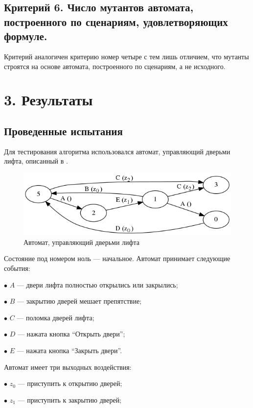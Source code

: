 \documentclass[12pt,fleqn]{article}
\begin{document}
\subsection{Критерий 6. Число мутантов автомата, построенного по сценариям, удовлетворяющих формуле.}

Критерий аналогичен критерию номер четыре с тем лишь отличием, что мутанты строятся на основе автомата, построенного по
сценариям, а не исходного.

\section{3. Результаты}

\subsection{Проведенные испытания}

Для тестирования алгоритма использовался автомат, управляющий дверьми лифта, описанный в \cite[Sec 2.3.1]{eg}.

\begin{figure}[!hb]
  \centering
    \includegraphics[scale=0.5]{lift.png}
  \caption{Автомат, управляющий дверьми лифта}
\end{figure}

Состояние под номером ноль --- начальное. Автомат принимает следующие события:

$\bullet$ $A$ --- двери лифта полностью открылись или закрылись;

$\bullet$ $B$ --- закрытию дверей мешает препятствие;

$\bullet$ $C$ --- поломка дверей лифта;

$\bullet$ $D$ --- нажата кнопка ``Открыть двери'';

$\bullet$ $E$ --- нажата кнопка ``Закрыть двери''.

Автомат имеет три выходных воздействия:

$\bullet$ $z_0$ --- приступить к открытию дверей;

$\bullet$ $z_1$ --- приступить к закрытию дверей;
\end{document}
